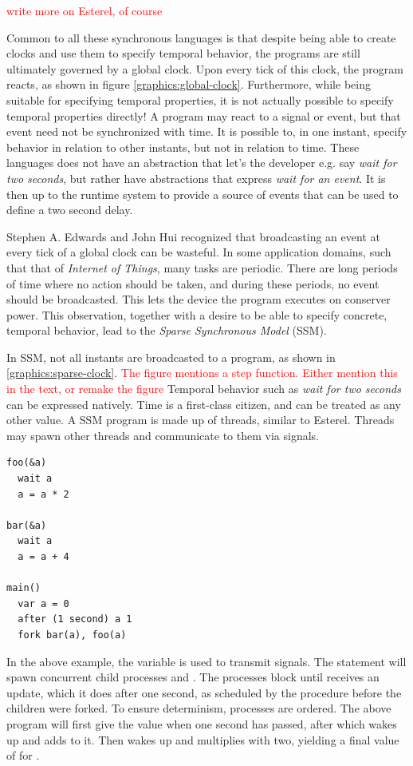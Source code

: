 \textcolor{red}{write more on Esterel, of course}

Common to all these synchronous languages is that despite being able to create clocks and use them to specify
temporal behavior, the programs are still ultimately governed by a global clock. Upon every tick of this clock, the program
reacts, as shown in figure \ref{graphics:global-clock}. Furthermore, while being suitable for specifying temporal
properties, it is not actually possible to specify temporal properties directly! A program may react to a signal or event,
but that event need not be synchronized with time. It is possible to, in one instant, specify behavior in relation to other
instants, but not in relation to time. These languages does not have an abstraction that let's the developer e.g. say
\textit{wait for two seconds}, but rather have abstractions that express \textit{wait for an event}. It is then up to the
runtime system to provide a source of events that can be used to define a two second delay.

Stephen A. Edwards and John Hui \cite{DBLP:conf/fdl/EdwardsH20} recognized that broadcasting an event at every tick of a global clock can be
wasteful. In some application domains, such that that of \textit{Internet of Things}, many tasks are periodic. There are
long periods of time where no action should be taken, and during these periods, no event should be broadcasted. This lets
the device the program executes on conserver power. This observation, together with a desire to be able to specify concrete,
temporal behavior, lead to the \textit{Sparse Synchronous Model} (SSM).

In SSM, not all instants are broadcasted to a program, as shown in \ref{graphics:sparse-clock}. \textcolor{red}{The figure mentions a step function. Either mention this in the text, or remake the figure} Temporal behavior such as
\textit{wait for two seconds} can be expressed natively. Time is a first-class citizen, and can be treated as any other value.
A SSM program is made up of threads, similar to Esterel. Threads may spawn other threads and communicate to them via signals.

\begin{verbatim}
foo(&a)
  wait a
  a = a * 2

bar(&a)
  wait a
  a = a + 4

main()
  var a = 0
  after (1 second) a 1
  fork bar(a), foo(a)
\end{verbatim}

In the above example, the variable  is used to transmit signals. The  statement will spawn concurrent
child processes  and . The processes block until  receives an update, which it does after one second,
as scheduled by the  procedure before the children were forked. To ensure determinism, processes are ordered. The
above program will first give  the value  when one second has passed, after which  wakes up and
adds  to it. Then  wakes up and multiplies  with two, yielding a final value of  for .

